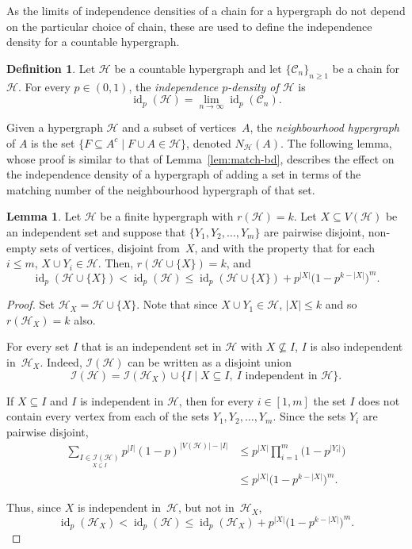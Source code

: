 \documentclass[11pt,reqno]{amsart}
\theoremstyle{definition}
\newtheorem{lemma}[theorem]{Lemma}
\newtheorem{definition}[theorem]{Definition}
\begin{document}
As the limits of independence densities of a chain for a hypergraph do not depend on the particular choice of chain, these are used to define the independence density for a countable hypergraph.

\begin{definition}\label{def:inf-id}
Let $\mathcal{H}$ be a countable hypergraph and let $\{\mathcal{C}_n\}_{n \geq 1}$ be a chain for~$\mathcal{H}$. For every $p \in (0,1)$, the \emph{independence $p$-density of $\mathcal{H}$} is
\[
 {\operatorname{id}}_p(\mathcal{H}) = \lim_{n \to \infty} {\operatorname{id}}_p(\mathcal{C}_n).
\]
\end{definition}

Given a hypergraph $\mathcal{H}$ and a subset of vertices~$A$, the \emph{neighbourhood hypergraph} of $A$ is the set $\{F \subseteq A^c  \mid  F \cup A \in \mathcal{H}\}$, denoted $N_{\mathcal{H}}(A)$. The following lemma, whose proof is similar to that of Lemma~\ref{lem:match-bd}, describes the effect on the independence density of a hypergraph of adding a set in terms of the matching number of the neighbourhood hypergraph of that set.

\begin{lemma}\label{lem:add-set}
Let $\mathcal{H}$ be a finite hypergraph with $r(\mathcal{H})= k$. Let $X \subseteq V(\mathcal{H})$ be an independent set and suppose that $\{Y_1, Y_2, \dots, Y_m\}$ are pairwise disjoint, non-empty sets of vertices, disjoint from~$X$, and with the property that for each $i \leq m$, $X \cup Y_i \in \mathcal{H}$. Then, $r(\mathcal{H} \cup \{X\}) = k$, and
\[
 {\operatorname{id}}_p(\mathcal{H} \cup \{X\}) < {\operatorname{id}}_p(\mathcal{H}) \leq {\operatorname{id}}_p(\mathcal{H} \cup \{X\}) + p^{|X|}\big(1 - p^{k - |X|} \big)^m.
\]
\end{lemma}
\begin{proof}
Set $\mathcal{H}_X = \mathcal{H} \cup \{X\}$.  Note that since $X \cup Y_1 \in \mathcal{H}$, $|X| \leq k$ and so $r(\mathcal{H}_X) = k$ also.

For every set $I$ that is an independent set in $\mathcal{H}$ with $X \nsubseteq I$, $I$ is also independent in~$\mathcal{H}_X$. Indeed, $\mathcal{I}(\mathcal{H})$ can be written as a disjoint union
\[
 \mathcal{I}(\mathcal{H}) = \mathcal{I}(\mathcal{H}_X) \cup \{I \mid X \subseteq I,\ I \text{ independent in } \mathcal{H}\}.
\]

If $X \subseteq I$ and $I$ is independent in $\mathcal{H}$, then for every $i \in [1,m]$ the set $I$ does not contain every vertex from each of the sets $Y_1, Y_2, \dots, Y_m$.  Since the sets $Y_i$ are pairwise disjoint,
\begin{align*}
\sum_{\underset{X \subseteq I}{I \in \mathcal{I}(\mathcal{H})}} p^{|I|}(1-p)^{|V(\mathcal{H})| - |I|}
	&\leq p^{|X|} \prod_{i = 1}^m\big(1-p^{|Y_i|}\big)\\
	&\leq p^{|X|} \big(1-p^{k-|X|}\big)^m.
	\end{align*}

Thus, since $X$ is independent in~$\mathcal{H}$, but not in~$\mathcal{H}_X$,
\[
 {\operatorname{id}}_p(\mathcal{H}_X) < {\operatorname{id}}_p(\mathcal{H}) \leq {\operatorname{id}}_p(\mathcal{H}_X) + p^{|X|}\big(1 - p^{k - |X|} \big)^m.
\]
\end{proof}
\end{document}
